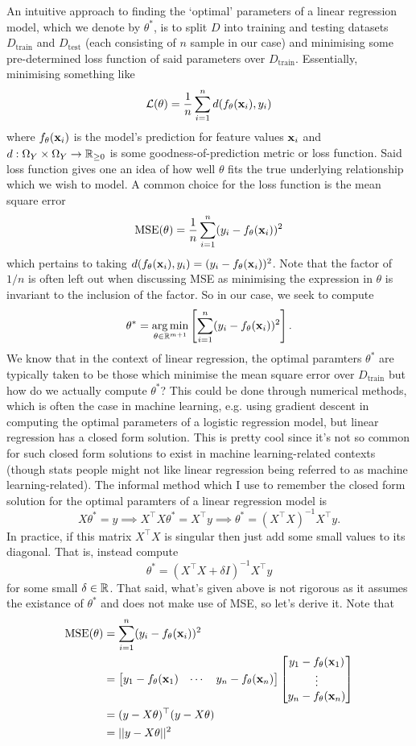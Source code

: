 \documentclass[11pt]{article}
\begin{document}
An intuitive approach to finding the `optimal' parameters of a linear regression model, which we denote by $\theta^{*}$, is to split $D$ into training and testing datasets $D_{\text{train}}$ and $D_{\text{test}}$ (each consisting of $n$ sample in our case) and minimising some pre-determined loss function of said parameters over $D_{\text{train}}$. Essentially, minimising something like
$$
\mathcal{L}(\theta)
=
\frac{1}{n}\sum_{i=1}^nd(f_{\theta}(\mathbf{x}_i), y_i)
$$
where $f_{\theta}(\mathbf{x}_i)$ is the model's prediction for feature values $\mathbf{x}_i$ and $d:\Omega_Y\times\Omega_Y\rightarrow\mathbb{R}_{\geq0}$ is some goodness-of-prediction metric or loss function. Said loss function gives one an idea of how well $\theta$ fits the true underlying relationship which we wish to model. A common choice for the loss function is the mean square error
$$
\text{MSE}(\theta)
=
\frac{1}{n}\sum_{i=1}^n(y_i-f_{\theta}(\mathbf{x}_i))^2
$$
which pertains to taking $d(f_{\theta}(\mathbf{x}_i), y_i)=(y_i-f_{\theta}(\mathbf{x}_i))^2$. Note that the factor of $1/n$ is often left out when discussing MSE as minimising the expression in $\theta$ is invariant to the inclusion of the factor. So in our case, we seek to compute
$$
\theta^{*}
=
\operatorname*{arg\,min}_{\theta\in\mathbb{R}^{m+1}}\left[\sum_{i=1}^n(y_i-f_{\theta}(\mathbf{x}_i))^2\right].
$$
We know that in the context of linear regression, the optimal paramters $\theta^{*}$ are typically taken to be those which minimise the mean square error over $D_{\text{train}}$ but how do we actually compute $\theta^{*}$? This could be done through numerical methods, which is often the case in machine learning, e.g. using gradient descent in computing the optimal parameters of a logistic regression model, but linear regression has a closed form solution. This is pretty cool since it's not so common for such closed form solutions to exist in machine learning-related contexts (though stats people might not like linear regression being referred to as machine learning-related). The informal method which I use to remember the closed form solution for the optimal paramters of a linear regression model is
$$
X\theta^{*}
=
y \implies X^{\top}X\theta^{*}=X^{\top}y \implies \theta^{*}=(X^{\top}X)^{-1}X^{\top}y.
$$
In practice, if this matrix $X^{\top}X$ is singular then just add some small values to its diagonal. That is, instead compute
$$
\theta^{*}
=
(X^{\top}X+\delta I)^{-1}X^{\top}y
$$
for some small $\delta\in\mathbb{R}$. That said, what's given above is not rigorous as it assumes the existance of $\theta^{*}$ and does not make use of MSE, so let's derive it. Note that
\begin{align*}
    \text{MSE}(\theta)
    &=
    \sum_{i=1}^n(y_i-f_{\theta}(\mathbf{x}_i))^2\\
    &=
    \begin{bmatrix}
        y_1-f_{\theta}(\mathbf{x}_1) & \cdots & y_n-f_{\theta}(\mathbf{x}_n)
    \end{bmatrix}
    \begin{bmatrix}
        y_1-f_{\theta}(\mathbf{x}_1)\\
        \vdots\\
        y_n-f_{\theta}(\mathbf{x}_n)
    \end{bmatrix}\\
    &=(y-X\theta)^{\top}(y-X\theta)\\
    &=||y-X\theta||^2
\end{align*}
\end{document}
